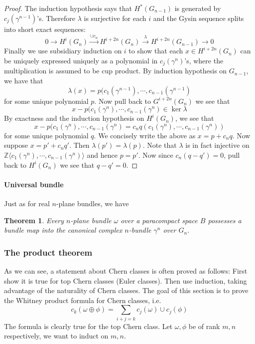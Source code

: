 \documentclass[12pt]{article}
\theoremstyle{plain}
\newtheorem{theorem}[equation]{Theorem}
\theoremstyle{definition}
\newcommand{\IZ}{\mathbb{Z}}
\newcommand{\<}{\langle}
\renewcommand{\>}{\rangle}
\newcommand{\w}{\omega}
\begin{document}
\begin{proof}
The induction hypothesis says that 
$ H^*(G_{n - 1})$ is generated by $c_j(\gamma^{n - 1})$'s. Therefore $\lambda$ is surjective for each $i$ and the Gysin sequence splits into short exact sequences:
$$ 0 \longrightarrow H^i(G_n) \stackrel{\cup c_n}{\longrightarrow} H^{i + 2n} (G_n) \stackrel{\lambda}{\longrightarrow} H^{i+2n}(G_{n -1}) \longrightarrow 0 $$
Finally we use subsidiary induction on $i$ to show that each $x \in H^{i + 2n}(G_n)$ can be uniquely expressed uniquely as a polynomial in $c_j(\gamma^n)$'s, where the multiplication is assumed to be cup product. By induction hypothesis on $G_{n-1}$, we have that 
$$ \lambda(x) = p(c_1(\gamma^{n-1}), \cdots, c_{n-1}(\gamma^{n-1})$$ for some unique polynomial $p$. Now pull back to $G^{i + 2n}(G_n)$ we see that 
$$ x - p(c_1(\gamma^{n}), \cdots, c_{n-1}(\gamma^{n}) \in \ker \lambda$$ By exactness and the induction hypothesis on $H^i(G_n)$, we see that 
$$ x - p(c_1(\gamma^{n}), \cdots, c_{n-1}(\gamma^{n}) = c_n q(c_1(\gamma^{n}), \cdots, c_{n-1}(\gamma^{n}))$$
for some unique polynomial $q$. We concisely write the above as $x = p + c_n q$. Now suppose $x = p' + c_n q'$. Then $\lambda(p') = \lambda(p)$. Note that $\lambda$ is in fact injective on $\IZ\<  c_1(\gamma^{n}), \cdots, c_{n-1}(\gamma^{n}) \>$ and hence $ p = p'$. Now since $c_n (q - q') = 0$, pull back to $H^i(G_n)$ we see that $q - q' = 0$. 
\end{proof}


\paragraph{Universal bundle}
Just as for real $n$-plane bundles, we have 
\begin{theorem}
Every $n$-plane bundle $\w$ over a paracompact space $B$ possesses a bundle map into the canonical complex $n$-bundle $\gamma^n$ over $G_n$. 
\end{theorem}


\subsubsection{The product theorem}  
As we can see, a statement about Chern classes is often proved as follows: First show it is true for top Chern classes (Euler classes). Then use induction, taking advantage of the naturality of Chern classes. The goal of this section is to prove the Whitney product formula for Chern classes, i.e. 
$$ c_k (\w \oplus \phi) = \sum_{i + j = k} c_j(\w) \cup c_j(\phi) $$
The formula is clearly true for the top Chern class. Let $\w, \phi$ be of rank $m, n$ respectively, we want to induct on $m, n$. 
\end{document}
